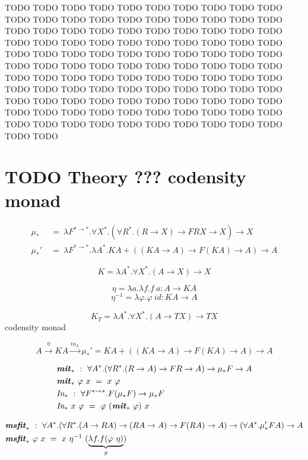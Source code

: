\documentclass[a4paper,UKenglish]{lipics}
\newcommand{\MIt}[1]{\ensuremath{\textbf{\textit{mit}}_{#1}}}
\newcommand{\msfit}[1]{\ensuremath{\textbf{\textit{msfit}}_{#1}}}
\newcommand{\In}[1]{\textit{In}_{#1}}
\newcommand{\inL}[0]{\textit{in}_{L}}
\begin{document}
TODO TODO TODO TODO TODO TODO TODO TODO TODO TODO TODO TODO TODO TODO
TODO TODO TODO TODO TODO TODO TODO TODO TODO TODO TODO TODO TODO TODO
TODO TODO TODO TODO TODO TODO TODO TODO TODO TODO TODO TODO TODO TODO
TODO TODO TODO TODO TODO TODO TODO TODO TODO TODO TODO TODO TODO TODO
TODO TODO TODO TODO TODO TODO TODO TODO TODO TODO TODO TODO TODO TODO
TODO TODO TODO TODO TODO TODO TODO TODO TODO TODO TODO TODO TODO TODO
TODO TODO TODO TODO TODO TODO TODO TODO TODO TODO TODO TODO TODO TODO
TODO TODO TODO TODO TODO TODO TODO TODO TODO TODO TODO TODO TODO TODO



\section{TODO Theory ??? codensity monad}
\begin{align*}
\mu_{*} &~=~ \lambda F^{* \to *}.\forall X^{*}.
		(\forall R^{*}.(R \to X) \to F R X \to X) \to X
	\\
\mu_{*}'&~=~ \lambda F^{* \to *}.\lambda A^{*}.
		K A + ((K A \to A) \to F(K A) \to A) \to A
\end{align*}

\[K = \lambda A^{*}.\forall X^{*}.(A \to X) \to X \]

\[ \eta = \lambda a.\lambda f.f~a : A \to KA \]
\[\eta^{-1} = \lambda \varphi.\varphi~\textit{id} : KA \to A\]


\[K_T = \lambda A^{*}.\forall X^{*}.(A \to T X) \to T X \] codensity monad


\[ A \xrightarrow{\eta} KA \xrightarrow{\inL} \mu_{*}' = KA+((KA \to A) \to F(KA) \to A) \to A \]


\begin{align*}
&\MIt{*} ~:~ \forall A^{*}.
	(\forall R^{*}.(R \to A) \to F R \to A) \to \mu_{*} F \to A \\
&\MIt{*}~\varphi~x ~=~ x~\varphi \\
&\In{*} ~:~\forall F^{* \to *}.F(\mu_{*} F) \to \mu_{*} F \\
&\In{*}~x~\varphi ~=~ \varphi~(\MIt{*}~\varphi)~x
\end{align*}


\begin{align*}
&\msfit{*} ~:~ \forall A^{*}.
	(\forall R^{*}.(A \to R A) \to (R A \to A) \to F(R A) \to A) \to
	(\forall A^{*}.\mu_{*}' F A) \to A \\
&\msfit{*}~\varphi~x ~=~ x~\eta^{-1}~(\underbrace{\lambda f.f(\varphi~\eta)}_g)
\end{align*}
\end{document}

